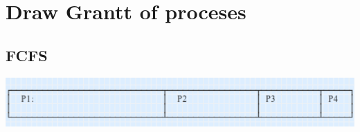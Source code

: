 \documentclass{article}
\begin{document}
\section{Draw Grantt of proceses}

\subsection{FCFS}
\includegraphics{02.report.scheduling.FCFS}
\end{document}
